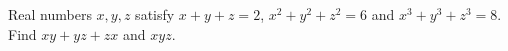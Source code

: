 Real numbers $x,y,z$ satisfy $x+y+z=2$, $x^2+y^2+z^2=6$ and $x^3+y^3+z^3=8$. Find $xy+yz+zx$ and $xyz$.
